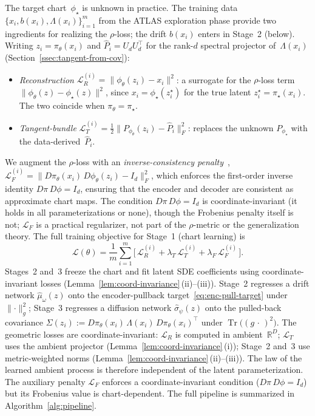 \documentclass[11pt]{article}
\newcommand{\cL}{\mathcal{L}}
\newcommand{\RD}{\mathbb{R}^D}
\newcommand{\tr}{\operatorname{Tr}}
\newcommand{\norm}[1]{\lVert#1\rVert}
\begin{document}
The target chart~$\phi_\star$ is unknown in practice.
The training data $\{x_i, b(x_i), \Lambda(x_i)\}_{i=1}^m$ from
the ATLAS exploration phase provide two ingredients for
realizing the $\rho$-loss; the drift $b(x_i)$ enters in
Stage~2 (below).
Writing $z_i = \pi_\theta(x_i)$ and
$\hat P_i = U_d U_d^\top$ for the rank-$d$ spectral projector
of~$\Lambda(x_i)$ (Section~\ref{ssec:tangent-from-cov}):
\begin{itemize}
\item \emph{Reconstruction}\;
$\cL_R^{(i)} = \norm{\phi_\theta(z_i) - x_i}^2$:
a surrogate for the $\rho$-loss term
$\norm{\phi_\theta(z) - \phi_\star(z)}^2$, since
$x_i = \phi_\star(z_i^\star)$ for the true latent
$z_i^\star = \pi_\star(x_i)$.
The two coincide when $\pi_\theta = \pi_\star$.
\item \emph{Tangent-bundle}\;
$\cL_T^{(i)} = \tfrac{1}{2}\norm{P_{\phi_\theta}(z_i) - \hat P_i}_F^2$:
replaces the unknown $P_{\phi_\star}$ with the data-derived~$\hat P_i$.
\end{itemize}
We augment the $\rho$-loss with an
\emph{inverse-consistency penalty}~\cite{greer2021icon},
$\cL_F^{(i)} = \norm{D\pi_\theta(x_i)\,D\phi_\theta(z_i) - I_d}_F^2$,
which enforces the first-order inverse identity
$D\pi\,D\phi = I_d$, ensuring that the encoder and decoder
are consistent as approximate chart maps.
The condition $D\pi\,D\phi = I_d$ is coordinate-invariant
(it holds in all parameterizations or none),
though the Frobenius penalty itself is not;
$\cL_F$ is a practical regularizer, not part of the
$\rho$-metric or the generalization theory.
The full training objective for Stage~1 (chart learning) is
\begin{equation}\label{eq:training-objective}
  \cL(\theta)
  = \frac{1}{m}\sum_{i=1}^{m}
    \bigl[\,
      \cL_R^{(i)}
      + \lambda_T\,\cL_T^{(i)}
      + \lambda_F\,\cL_F^{(i)}
    \,\bigr].
\end{equation}
Stages~2 and~3 freeze the chart and fit latent SDE coefficients
using coordinate-invariant losses
(Lemma~\ref{lem:coord-invariance}\,(ii)--(iii)).
Stage~2 regresses a drift network $\hat\mu_\omega(z)$
onto the encoder-pullback target~\eqref{eq:enc-pull-target}
under $\norm{\cdot}_g^2$;
Stage~3 regresses a diffusion network
$\hat\sigma_\psi(z)$ onto the pulled-back covariance
$\Sigma(z_i) := D\pi_\theta(x_i)\,\Lambda(x_i)\,D\pi_\theta(x_i)^\top$
under $\tr\bigl((g\,\cdot\,)^2\bigr)$.
The geometric losses are coordinate-invariant:
$\cL_R$ is computed in ambient~$\RD$;
$\cL_T$ uses the ambient projector
(Lemma~\ref{lem:coord-invariance}\,(i));
Stage~2 and~3 use metric-weighted norms
(Lemma~\ref{lem:coord-invariance}\,(ii)--(iii)).
The law of the learned ambient process is therefore
independent of the latent parameterization.
The auxiliary penalty $\cL_F$ enforces a
coordinate-invariant condition ($D\pi\,D\phi=I_d$) but its
Frobenius value is chart-dependent.
The full pipeline is summarized in Algorithm~\ref{alg:pipeline}.
\end{document}
